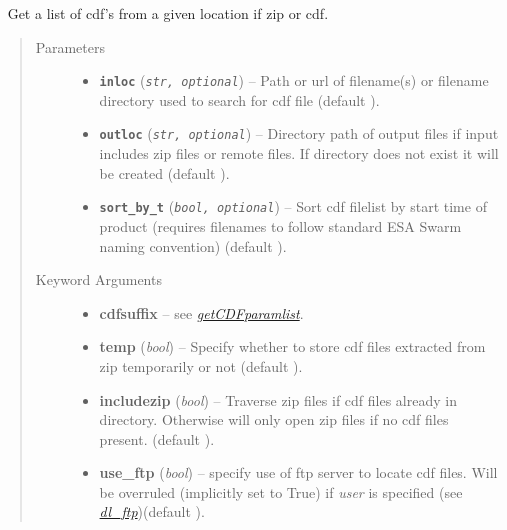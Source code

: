 \documentclass[letterpaper,10pt,english]{sphinxhowto}
\begin{document}

\begin{fulllineitems}
\label{swtools_doc:swtools.getCDFlist}~\label{swtools_doc:getcdflist}
Get a list of cdf's from a given location if zip or cdf.
\begin{quote}\begin{description}
\item[{Parameters}] \leavevmode\begin{itemize}
\item {} 
\textbf{\texttt{inloc}} (\emph{\texttt{str, optional}}) -- Path or url of filename(s) or filename directory used to search
for cdf file (default ).

\item {} 
\textbf{\texttt{outloc}} (\emph{\texttt{str, optional}}) -- Directory path of output files if input includes zip files or
remote files. If directory does not exist it will be created
(default ).

\item {} 
\textbf{\texttt{sort\_by\_t}} (\emph{\texttt{bool, optional}}) -- Sort cdf filelist by start time of product (requires filenames
to follow standard ESA Swarm naming convention)
(default ).

\end{itemize}

\item[{Keyword Arguments}] \leavevmode\begin{itemize}
\item {} 
\textbf{cdfsuffix} --
see {\hyperref[swtools_doc:getcdfparamlist]{\emph{getCDFparamlist}}}.

\item {} 
\textbf{temp} (\emph{bool}) --
Specify whether to store cdf files extracted from zip
temporarily or not (default ).

\item {} 
\textbf{includezip} (\emph{bool}) --
Traverse zip files if cdf files already in directory. Otherwise
will only open zip files if no cdf files present.
(default ).

\item {} 
\textbf{use\_ftp} (\emph{bool}) --
specify use of ftp server to locate cdf files. Will be
overruled (implicitly set to True) if \emph{user} is specified
(see {\hyperref[swtools_doc:dl\string-ftp]{\emph{dl\_ftp}}})(default ).


\end{itemize}
\end{description}
\end{quote}
\end{fulllineitems}
\end{document}
